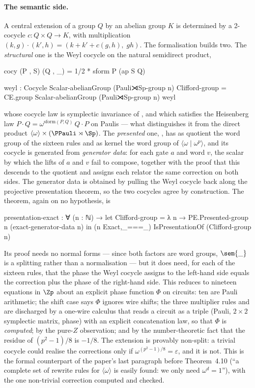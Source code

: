 \paragraph{The semantic side.}  A central extension of a group $Q$ by
an abelian group $K$ is determined by a 2-cocycle $c : Q \times Q \to
K$, with multiplication $(k, g)\cdot(k', h) = (k + k' + c(g,h),\; gh)$.
The formalisation builds two.  The \emph{structural} one is the Weyl
cocycle on the natural semidirect product,
\begin{agdacode}
cocy (P , S) (Q , _) = 1/2 * sform P (ap S Q)

weyl : Cocycle Scalar-abelianGroup (Pauli⋊Sp-group n)
Clifford-group = CE.group Scalar-abelianGroup (Pauli⋊Sp-group n) weyl
\end{agdacode}
whose cocycle law is symplectic invariance of , and which
satisfies the Heisenberg law $P \cdot Q = \omega^{\mathrm{sform}(P,Q)}
\, Q \cdot P$ on Paulis --- what distinguishes it from the direct product
$\langle\omega\rangle \times (\PPauli \rtimes \Sp)$.  The
\emph{presented} one, , has as quotient the word
group of the sixteen rules and as kernel the word group of
$\langle\omega \mid \omega^{p}\rangle$, and its cocycle is generated
from \emph{generator data}: for each gate $a$ and word $v$, the scalar
by which the lifts of $a$ and $v$ fail to compose, together with the
proof that this descends to the quotient and assigns each relator the
same correction on both sides.  The generator data is obtained by pulling
the Weyl cocycle back along the projective presentation theorem, so the
two cocycles agree by construction.  The theorem, again on no hypothesis,
is

\begin{agdacode}
presentation-exact : ∀ (n : ℕ) →
  let Clifford-group = λ n → PE.Presented-group n (exact-generator-data n)
  in (n Exact,_===_) IsPresentationOf (Clifford-group n)
\end{agdacode}

Its proof needs no normal forms --- since both factors are word groups,
$\sem{\_}$ is a splitting rather than a normalisation --- but it does
need, for each of the sixteen rules, that the phase the Weyl cocycle
assigns to the left-hand side equals the correction plus the phase of
the right-hand side.  This reduces to nineteen equations in $\Zp$ about
an explicit phase function $\Phi$ on circuits: ten are Pauli arithmetic;
the shift case says $\Phi$ ignores wire shifts; the three multiplier
rules and  are discharged by a one-wire calculus that
reads a circuit as a triple (Pauli, $2 \times 2$ symplectic matrix,
phase) with an explicit concatenation law, so that $\Phi$ is
\emph{computed};  by the pure-$Z$ observation; and
 by the number-theoretic fact that the residue of
$(p^2-1)/8$ is $-1/8$.  The extension is provably non-split: a trivial
cocycle could realise the corrections only if
$\omega^{(p^2-1)/8} = \varepsilon$, and it is not.  This is the formal
counterpart of the paper's last paragraph before Theorem~4.10 (``a
complete set of rewrite rules for $\langle\omega\rangle$ is easily
found: we only need $\omega^{d} = 1$''), with the one non-trivial
correction computed and checked.
